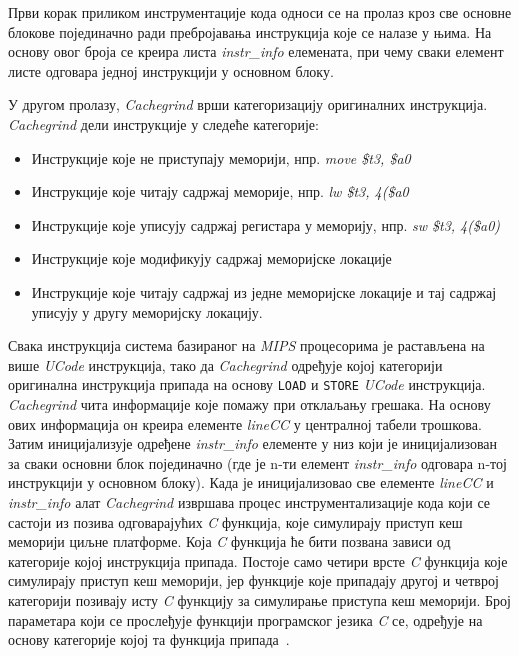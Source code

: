 \documentclass[12pt,oneside]{memoir}
\begin{document}
\indent Први корак приликом инструментације кода односи се на пролаз кроз све основне блокове појединачно ради пребројавања инструкција које се налазе у њима. На основу овог броја се креира листа \textit{instr\_info} елемената, при чему сваки елемент листе одговара једној инструкцији у основном блоку.

\indent У другом пролазу, \textit{Cachegrind} врши категоризацију оригиналних инструкција. \textit{Cachegrind} дели инструкције у следеће категорије:

\begin{itemize}
  \item Инструкције које не приступају меморији, нпр. \textit{move \$t3, \$a0}
  \item Инструкције које читају садржај меморије, нпр. \textit{lw \$t3, 4(\$a0}
  \item Инструкције које уписују садржај регистара у меморију, нпр. \textit{sw \$t3, 4(\$a0)}
  \item Инструкције које модификују садржај меморијске локације
  \item Инструкције које читају садржај из једне меморијске локације и тај садржај уписују у другу меморијску локацију.
\end{itemize}

\indent Свака инструкција система базираног на \textit{MIPS} процесорима је растављена на више \textit{UCode} инструкција, тако да \textit{Cachegrind} одређује којој категорији оригинална инструкција припада на основу \texttt{LOAD} и \texttt{STORE} \textit{UCode} инструкција. \textit{Cach\-egrind} чита информације које помажу при отклаљању грешака. На основу ових информација он креира елементе \textit{lineCC} у централној табели трошкова. Затим иницијализује одређене \textit{instr\_info} елементе у  низ који је иницијализован за сваки основни блок појединачно (где је n-ти елемент \textit{instr\_info} одговара n-тој инструкцији у основном блоку). Када је иницијализовао све елементе \textit{lineCC} и \textit{instr\_info} алат \textit{Cachegrind} извршава процес инструментализације кода који се састоји из позива одговарајућих \textit{C} функција, које симулирају приступ кеш меморији циљне платформе. Која \textit{C} функција ће бити позвана зависи од категорије којој инструкција припада. Постоје само четири врсте \textit{C} функција које симулирају приступ кеш меморији, јер функције које припадају другој и четврој категорији позивају исту \textit{C} функцију за симулирање приступа кеш меморији. Број параметара који се прослеђује функцији програмског језика \textit{C} се, одређује на основу категорије којој та функција припада~\cite{cachegrindRef}.
\end{document}
